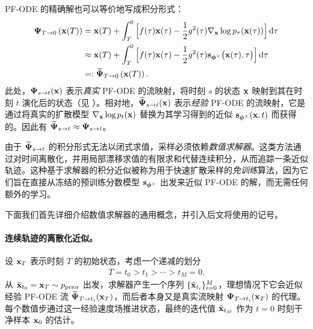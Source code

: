 PF-ODE 的精确解也可以等价地写成积分形式：
\begin{align}\label{eq:solution-int-score}
\begin{aligned}
    {\bm{\Psi}}_{T\to 0} \left({\mathbf{x}}(T)\right) 
    &= {\mathbf{x}}(T) + \int_T^0  \Big[f(\tau){\mathbf{x}}(\tau) - \frac{1}{2}g^2(\tau) \nabla_{{\mathbf{x}}}\log p_\tau({\mathbf{x}}(\tau))\Big]\mathop{}\!\mathrm{d} \tau \\
    &\approx {\mathbf{x}}(T) + \int_T^0  \Big[f(\tau){\mathbf{x}}(\tau) - \frac{1}{2}g^2(\tau) {\mathbf{s}}_{\bm{\phi}^\times} \big({\mathbf{x}}(\tau), \tau\big)\Big]\mathop{}\!\mathrm{d} \tau \\
    &=:\widetilde{{\bm{\Psi}}}_{T\to 0} \left({\mathbf{x}}(T)\right).
\end{aligned}
\end{align}
此处，${\bm{\Psi}}_{s\to t}({\mathbf{x}})$ 表示\emph{真实} PF-ODE 的流映射，将时刻 $s$ 的状态 ${\mathbf{x}}$ 映射到其在时刻 $t$ 演化后的状态（见 ）。相对地，$\widetilde{{\bm{\Psi}}}_{s\to t}({\mathbf{x}})$ 表示\emph{经验} PF-ODE 的流映射，它是通过将真实的扩散模型 $\nabla_{{\mathbf{x}}}\log p_t({\mathbf{x}})$ 替换为其学习得到的近似 ${\mathbf{s}}_{\bm{\phi}^\times}({\mathbf{x}},t)$ 而获得的。因此有 $\widetilde{{\bm{\Psi}}}_{s\to t}  \approx  {\bm{\Psi}}_{s\to t}$。

由于 $\widetilde{{\bm{\Psi}}}_{s\to t}$ 的积分形式无法以闭式求值，采样必须依赖\emph{数值求解器}。这类方法通过对时间离散化，并用局部漂移求值的有限求和代替连续积分，从而追踪一条近似轨迹。这种基于求解器的积分近似被称为用于快速扩散采样的\emph{免训练}算法，因为它们旨在直接从冻结的预训练分数模型 ${\mathbf{s}}_{\bm{\phi}^\times}$ 出发来近似 PF-ODE 的解，而无需任何额外的学习。

下面我们首先详细介绍数值求解器的通用概念，并引入后文将使用的记号。

\paragraph{连续轨迹的离散化近似。}
设 ${\mathbf{x}}_T$ 表示时刻 $T$ 的初始状态，考虑一个递减的划分
\begin{align}\label{eq:time-step-def}
    T = t_0 > t_1 > \cdots > t_M = 0.
\end{align}
从 $\tilde{{\mathbf{x}}}_{t_0} = {\mathbf{x}}_T \sim p_{\mathrm{prior}}$ 出发，求解器产生一个序列 $\{\tilde{{\mathbf{x}}}_{t_i}\}_{i=0}^M$，理想情况下它会近似经验 PF-ODE 流 $\widetilde{{\bm{\Psi}}}_{T\to t_i}({\mathbf{x}}_T)$，而后者本身又是真实流映射 ${\bm{\Psi}}_{T\to t_i}({\mathbf{x}}_T)$ 的代理。每个数值步通过这一经验速度场推进状态，最终的迭代值 $\tilde{{\mathbf{x}}}_{t_M}$ 作为 $t=0$ 时刻干净样本 ${\mathbf{x}}_0$ 的估计。




